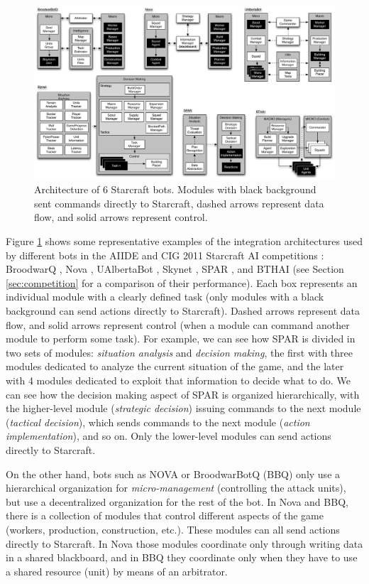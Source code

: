 \documentclass[journal]{IEEEtran}
\begin{document}
\begin{figure}[ta]
    \centering
    \includegraphics[width=\textwidth]{figures/figure-bot-architectures-wide.pdf}
    \caption{Architecture of 6 Starcraft bots. Modules with black background sent commands directly to Starcraft, dashed arrows represent data flow, and solid arrows represent control.}
    \label{fig:bot-architecture}
\end{figure}

Figure \ref{fig:bot-architecture} shows some representative examples of the integration architectures used by different bots in the AIIDE and CIG 2011 Starcraft AI competitions \cite{url1,url2}: BroodwarQ \cite{???}, Nova \cite{???}, UAlbertaBot \cite{???}, Skynet \cite{???}, SPAR \cite{???}, and BTHAI \cite{???} (see Section \ref{sec:competition} for a comparison of their performance). Each box represents an individual module with a clearly defined task (only modules with a black background can send actions directly to Starcraft). Dashed arrows represent data flow, and solid arrows represent control (when a module can command another module to perform some task). For example, we can see how SPAR is divided in two sets of modules: {\em situation analysis} and {\em decision making}, the first with three modules dedicated to analyze the current situation of the game, and the later with 4 modules dedicated to exploit that information to decide what to do. We can see how the decision making aspect of SPAR is organized hierarchically, with the higher-level module ({\em strategic decision}) issuing commands to the next module ({\em tactical decision}), which sends commands to the next module ({\em action implementation}), and so on. Only the lower-level modules can send actions directly to Starcraft. 

On the other hand, bots such as NOVA or BroodwarBotQ (BBQ) only use a hierarchical organization for {\em micro-management} (controlling the attack units), but use a decentralized organization for the rest of the bot. In Nova and BBQ, there is a collection of modules that control different aspects of the game (workers, production, construction, etc.). These modules can all send actions directly to Starcraft. In Nova those modules coordinate only through writing data in a shared blackboard, and in BBQ they coordinate only when they have to use a shared resource (unit) by means of an arbitrator.
\end{document}
